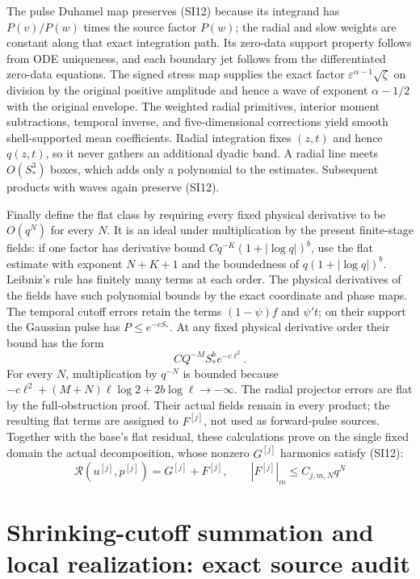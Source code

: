 \documentclass[10pt,a4paper]{article}
\begin{document}
The pulse Duhamel map preserves (SI12) because its integrand has
$P(v)/P(w)$ times the source factor $P(w)$; the radial and slow weights
are constant along that exact integration path.  Its zero-data support
property follows from ODE uniqueness, and each boundary jet follows from
the differentiated zero-data equations.  The signed stress map supplies
the exact factor $\varepsilon^{\alpha-1}\sqrt\zeta$ on division by
the original positive amplitude and hence a wave of exponent
$\alpha-1/2$ with the original envelope.  The weighted radial primitives,
interior moment subtractions, temporal inverse, and five-dimensional
corrections yield smooth shell-supported mean coefficients.  Radial
integration fixes $(z,t)$ and hence $q(z,t)$, so it never gathers an
additional dyadic band.  A radial line meets $O(S_*^3)$ boxes, which adds
only a polynomial to the estimates.  Subsequent products with waves again
preserve (SI12).

Finally define the flat class by requiring every fixed physical derivative
to be $O(q^N)$ for every $N$.  It is an ideal under multiplication by
the present finite-stage fields: if one factor has derivative bound
$Cq^{-K}(1+|\log q|)^b$, use the flat estimate with exponent
$N+K+1$ and the boundedness of $q(1+|\log q|)^b$.  Leibniz's rule has
finitely many terms at each order.  The physical derivatives of the fields
have such polynomial bounds by the exact coordinate and phase maps.
The temporal cutoff errors retain the terms $(1-\psi)f$ and $\psi't$;
on their support the Gaussian pulse has $P\le e^{-cS_*}$.  At any fixed
physical derivative order their bound has the form
\[
C Q^{-M}S_*^b e^{-c\ell^2}.
\]
For every $N$, multiplication by $q^{-N}$ is bounded because
$-c\ell^2+(M+N)\ell\log2+2b\log\ell\to-\infty$.
The radial projector errors are flat by the full-obstruction proof.
Their actual fields remain in every product; the resulting flat terms
are assigned to $F^{[j]}$, not used as forward-pulse sources.  Together
with the base's flat residual, these calculations prove on the single fixed
domain the actual decomposition, whose nonzero $G^{[j]}$ harmonics satisfy
(SI12):
\[
\mathcal R(u^{[j]},p^{[j]})=G^{[j]}+F^{[j]},\qquad
|F^{[j]}|_m\le C_{j,m,N}q^N
\]



\section{Shrinking-cutoff summation and local realization: exact source audit}\label{shrinking-cutoff-summation-and-local-realization-exact-source-audit}
\end{document}
